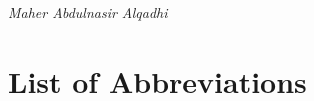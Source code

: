 \documentclass[12pt,a4paper,oneside]{report}
\begin{document}
\begin{flushright}
\textit{Maher Abdulnasir Alqadhi}
\end{flushright}

\clearpage

\tableofcontents
\clearpage
\listoffigures
\clearpage
\listoftables
\clearpage

\chapter*{List of Abbreviations}
\end{document}
